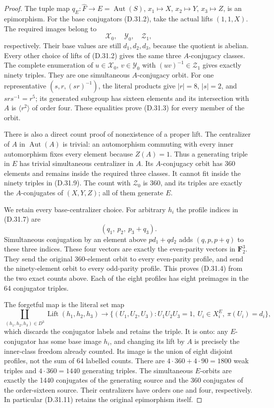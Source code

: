 \begin{proof}
The tuple map
$q_E:\widehat F\to E=\operatorname{Aut}(S)$,
$x_1\mapsto X$, $x_2\mapsto Y$,
$x_3\mapsto Z$, is an epimorphism.
For the base conjugators
\textup{(D.31.2)}, take the actual lifts
$(1,1,X)$.  The required images belong
to
\[
                 \mathcal X_0,\quad
                 \mathcal Y_0,\quad
                 \mathcal Z_1,
 \tag{D.31.9}
\]
respectively.  Their base values are
still $d_1,d_2,d_3$, because the quotient
is abelian.  Every other choice of
lifts of \textup{(D.31.2)} gives the
same three $A$-conjugacy classes.
The complete enumeration of
$u\in\mathcal X_0$, $v\in\mathcal Y_0$
with $(uv)^{-1}\in\mathcal Z_1$ gives
exactly ninety triples.  They are one
simultaneous $A$-conjugacy orbit.
For one representative $(s,r,(sr)^{-1})$,
the literal products give
$|r|=8$, $|s|=2$, and $srs^{-1}=r^5$;
its generated subgroup has sixteen
elements and its intersection with
$A$ is $\langle r^2\rangle$ of order
four.  These equalities prove
\textup{(D.31.3)} for every member
of the orbit.

There is also a direct count proof of
nonexistence of a proper lift.
The centralizer of $A$ in
$\operatorname{Aut}(A)$ is trivial:
an automorphism commuting with every
inner automorphism fixes every element
because $Z(A)=1$.  Thus a generating
triple in $E$ has trivial simultaneous
centralizer in $A$.  Its $A$-conjugacy
orbit has 360 elements and remains
inside the required three classes.
It cannot fit inside the ninety
triples in \textup{(D.31.9)}.
The count with $\mathcal Z_0$ is
360, and its triples are exactly the
$A$-conjugates of $(X,Y,Z)$; all of
them generate $E$.

We retain every base-centralizer
choice.  For arbitrary $h_i$ the
profile indices in
\textup{(D.31.7)} are
\[
                  (q_1,\ p_2,\ p_3+q_3).
 \tag{D.31.10}
\]
Simultaneous conjugation by an element
above $p d_1+q d_2$ adds
$(q,p,p+q)$ to these three indices.
These four vectors are exactly the
even-parity vectors in $\mathbf F_2^3$.
They send the original 360-element
orbit to every even-parity profile,
and send the ninety-element orbit
to every odd-parity profile.  This
proves \textup{(D.31.4)} from the
two exact counts above.  Each of the
eight profiles has eight preimages
in the 64 conjugator triples.

The forgetful map is the literal
set map
\[
 \coprod_{(h_1,h_2,h_3)\in D^3}
       \operatorname{Lift}(h_1,h_2,h_3)
   \longrightarrow
 \{(U_1,U_2,U_3):U_1U_2U_3=1,\
              U_i\in X_i^E,\ \pi(U_i)=d_i\},
 \tag{D.31.11}
\]
which discards the conjugator labels
and retains the triple.
It is onto: any $E$-conjugator has
some base image $h_i$, and changing
its lift by $A$ is precisely the
inner-class freedom already counted.
Its image is the union of eight
disjoint profiles, not the sum of
64 labelled counts.  There are
$4\cdot360+4\cdot90=1800$ weak
triples and $4\cdot360=1440$
generating triples.  The simultaneous
$E$-orbits are exactly the 1440
conjugates of the generating source
and the 360 conjugates of the
order-sixteen source.  Their
centralizers have orders one and
four, respectively.  In particular
\textup{(D.31.11)} retains the
original epimorphism itself.


\end{proof}
